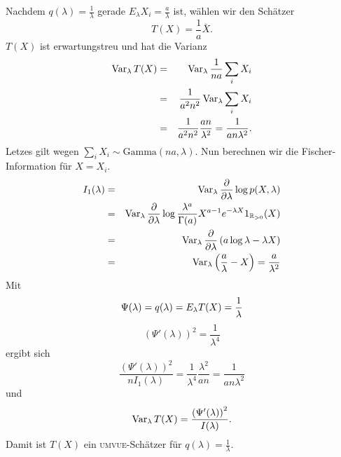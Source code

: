 Nachdem $q(\lambda)=\frac{1}{\lambda}$ gerade $E_\lambda X_i=\frac{a}{\lambda}$ ist, 
wählen wir den Schätzer 
\begin{equation}
    T(X)=\frac{1}{a}\bar X.
\end{equation}
$T(X)$ ist erwartungstreu und hat
die Varianz
\begin{eqnarray}
    \operatorname{Var}_\lambda T(X) &=&  \operatorname{Var}_\lambda \frac{1}{na} \sum_{i}^{} X_i \\ 
    &=& \frac{1}{a^2 n^2} \operatorname{Var}_\lambda \sum_{i}^{} X_i \\
    &=&  \frac{1}{a^2 n^2} \frac{an}{\lambda^2} = \frac{1}{an \lambda^2}. 
\end{eqnarray}
Letzes gilt wegen $\sum_{i}^{} X_i \sim \textrm{Gamma}(na,\lambda)$. Nun berechnen wir die
Fischer-Information für $X=X_i$.
\begin{eqnarray}
    I_1(\lambda) &=&  \operatorname{Var}_\lambda \frac{\partial}{\partial \lambda} \log p(X,\lambda) \\
    &=& \operatorname{Var}_\lambda \frac{\partial}{\partial \lambda} \log \frac{\lambda^a}{\Gamma(a)} X^{a-1}e^{-\lambda X} 1_{\mathbb R_{>0}}(X) \\
    &=& \operatorname{Var}_\lambda \frac{\partial}{\partial \lambda} \left( a \log \lambda - \lambda X \right) \\
    &=& \operatorname{Var}_\lambda \left( \frac{a}{\lambda} - X \right) = \frac{a}{\lambda^2}
\end{eqnarray}
Mit 
\begin{equation}
    \Psi(\lambda) = q(\lambda)=E_\lambda T(X) =\frac{1}{\lambda} \\
\end{equation}
\begin{equation}
    \left( \Psi'(\lambda) \right)^2 = \frac{1}{\lambda^4}
\end{equation}
ergibt sich 
\begin{equation}
    \frac{  \left( \Psi'(\lambda) \right)^2 }{n I_1(\lambda)} 
    = \frac{1}{\lambda^4} \frac{\lambda^2}{an} = \frac{1}{ an \lambda^2}
\end{equation}
und
\begin{equation}
    \operatorname{Var}_{\lambda} T(X) = \frac{  \left( \Psi'(\lambda) \right)^2 }{I(\lambda)}.
\end{equation}
Damit ist $T(X)$ ein \textsc{umvue}-Schätzer für $q(\lambda)=\frac{1}{\lambda}$.







